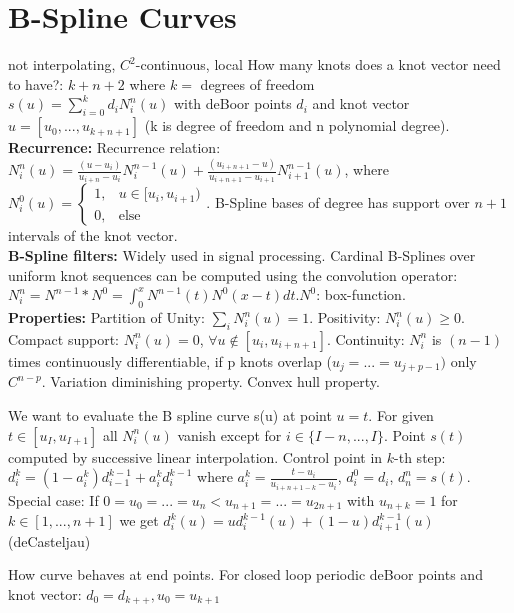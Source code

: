 \section{B-Spline Curves}
not interpolating, $C^2$-continuous, local
How many knots does a knot vector need to have?: $k + n + 2$ where $k = $ degrees of freedom\\
 $s(u) = \sum_{i=0}^kd_iN_i^n(u)$ with deBoor points $d_i$ and knot vector $u = [u_0, ..., u_{k+n+1}]$ (k is degree of freedom and n polynomial degree).\\ 
\textbf{Recurrence:} Recurrence relation: $N_i^n(u) = \frac{(u - u_i)}{u_{i+n} - u_i} N_i^{n-1}(u) + \frac{(u_{i+n+1} - u)}{u_{i+n+1} - u_{i+1}} N_{i+1}^{n-1}(u)$, where $N_i^0(u) = \begin{cases} 1, & u \in [u_i, u_{i+1}) \\ 0, & \text{else} \end{cases}$. B-Spline bases of degree has support over $n+1$ intervals of the knot vector.\\
\textbf{B-Spline filters:} Widely used in signal processing. Cardinal B-Splines over uniform knot sequences can be computed using the convolution operator: \( N_i^n = N^{n-1} * N^0 = \int_{0}^{x} N^{n-1}(t)N^0(x - t) dt \).\( N^0 \): box-function.\\
\textbf{Properties:} 
Partition of Unity: $\sum_i N_i^n(u) = 1$. 
Positivity: $N_i^n(u) \geq 0$.
Compact support: $N_i^n(u) = 0$, $\forall u \notin [u_i, u_{i+n+1}]$.
Continuity: $N_i^n$ is $(n-1)$ times continuously differentiable, if p knots overlap ($u_j = ... = u_{j+p-1})$ only $C^{n-p}$.
Variation diminishing property.
Convex hull property.


 We want to evaluate the B spline curve s(u) at point $u=t$. For given $t \in [u_I, u_{I+1}]$ all $N_i^n(u)$ vanish except for $i \in \{I-n, ...,I\}$. Point $s(t)$ computed by successive linear interpolation. Control point in $k$-th step: $d_i^k = (1 - a_i^k)d_{i-1}^{k-1} + a_i^k d_i^{k-1} $ where $ a_i^k = \frac{t - u_i}{u_{i+n+1-k} - u_i} $, $d_i^0 = d_i$, $d_n^n = s(t)$. Special case: If $0 = u_0 = ... = u_n < u_{n+1} = ... = u_{2n+1}$ with $u_{n+k} = 1$ for $k \in [1, ...,n+1]$ we get $d_i^k(u)=ud_i^{k-1}(u)+(1-u)d_{i+1}^{k-1}(u)$ (deCasteljau)

 How curve behaves at end points. For closed loop periodic deBoor points and knot vector: $d_0=d_{k++}, u_0=u_{k+1}$